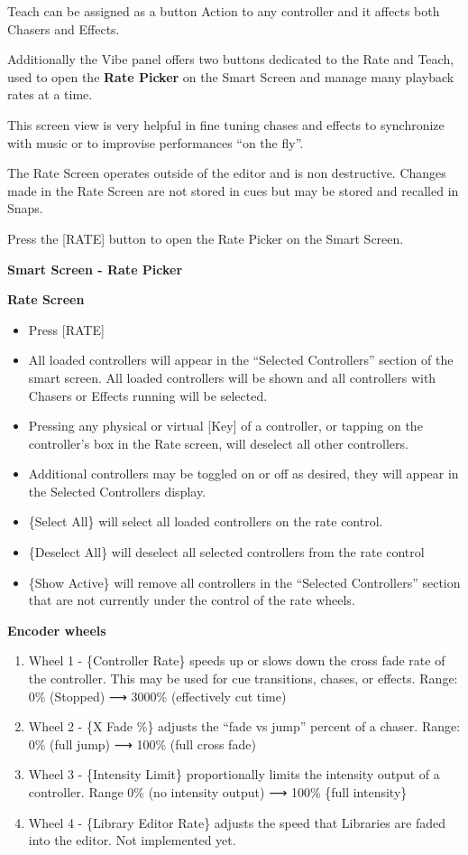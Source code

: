 \documentclass[
]{article}
\begin{document}
Teach can be assigned as a button Action to any controller and it affects both Chasers and Effects.

Additionally the Vibe panel offers two buttons dedicated to the Rate and Teach, used to open the \textbf{Rate Picker} on the Smart Screen and manage many playback rates at a time.

This screen view is very helpful in fine tuning chases and effects to synchronize with music or to improvise performances ``on the fly''.

The Rate Screen operates outside of the editor and is non destructive. Changes made in the Rate Screen are not stored in cues but may be stored and recalled in Snaps.

Press the {[}RATE{]} button to open the Rate Picker on the Smart Screen.

\textbf{Smart Screen - Rate Picker}

\textbf{Rate Screen}

\begin{itemize}
\item
  Press {[}RATE{]}
\item
  All loaded controllers will appear in the ``Selected Controllers'' section of the smart screen. All loaded controllers will be shown and all controllers with Chasers or Effects running will be selected.
\item
  Pressing any physical or virtual {[}Key{]} of a controller, or tapping on the controller's box in the Rate screen, will deselect all other controllers.
\item
  Additional controllers may be toggled on or off as desired, they will appear in the Selected Controllers display.
\item
  \{Select All\} will select all loaded controllers on the rate control.
\item
  \{Deselect All\} will deselect all selected controllers from the rate control
\item
  \{Show Active\} will remove all controllers in the ``Selected Controllers'' section that are not currently under the control of the rate wheels.
\end{itemize}

\textbf{Encoder wheels}

\begin{enumerate}
\def\labelenumi{\arabic{enumi}.}
\item
  Wheel 1 - \{Controller Rate\} speeds up or slows down the cross fade rate of the controller. This may be used for cue transitions, chases, or effects.
  Range: 0\% (Stopped) ⟶ 3000\% (effectively cut time)
\item
  Wheel 2 - \{X Fade \%\} adjusts the ``fade vs jump'' percent of a chaser.
  Range: 0\% (full jump) ⟶ 100\% (full cross fade)
\item
  Wheel 3 - \{Intensity Limit\} proportionally limits the intensity output of a controller.
  Range 0\% (no intensity output) ⟶ 100\% \{full intensity\}
\item
  Wheel 4 - \{Library Editor Rate\} adjusts the speed that Libraries are faded into the editor. {Not implemented yet.}
\end{enumerate}
\end{document}
